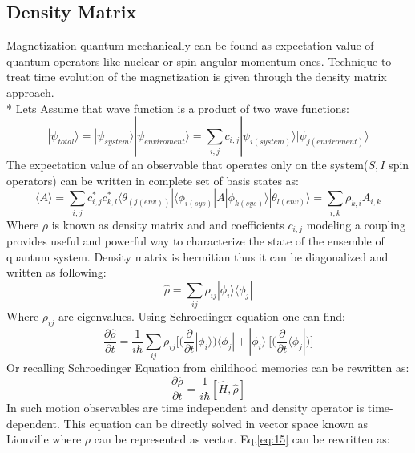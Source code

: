 \subsection{Density Matrix} 
Magnetization quantum mechanically can be found as expectation value of quantum operators like nuclear or spin angular momentum ones. Technique to treat time evolution of the magnetization is given through the density matrix approach.\\* 
Lets Assume that wave function is a product of two wave functions: 
\begin{equation}\label{eq:10}
|\psi_{total}\rangle=|\psi_{system}\rangle|\psi_{enviroment}\rangle=\sum_{i,j} c_{i,j}|\psi_{i(system)}\rangle|\psi_{j(enviroment)}\rangle
\end{equation}
The expectation value of an observable that operates only on the system($S,I$ spin operators) can be written in complete set of basis states as:
\begin{equation}\label{eq:11}
\langle A \rangle=\sum_{i,j} c_{i,j}^*c_{k,l}^*\langle \theta_{(j(env))}|\langle \phi _{i(sys)}|A|\phi_{k(sys)}\rangle|\theta_{l(env)}\rangle=\sum_{i,k}\rho_{k,i}A_{i,k}
\end{equation}
Where $\rho$ is known as density matrix and and coefficients $c_{i,j}$ modeling a coupling  provides useful and powerful way to characterize the state of the ensemble of quantum system. 
Density matrix is hermitian thus it can be diagonalized and written as following: 
\begin{equation}\label{eq:13}
\hat{\rho}=\sum_{ij}\rho_{ij}|\phi_i\rangle\langle \phi_j|
\end{equation} 
Where $\rho_{ij}$ are eigenvalues. 
Using Schroedinger equation one can find: 
\begin{equation}\label{eq:14}
\frac{\partial \hat{\rho}}{\partial t}=\frac{1}{i\hbar}\sum_{ij}\rho_{ij}\Big[\Big(\frac{\partial}{\partial t}|\phi_i\rangle\Big)\langle \phi_j|+|\phi_i\rangle\ \Big[\Big(\frac{\partial}{\partial t}\langle \phi_j|\Big)\Big]
\end{equation} 
Or recalling Schroedinger Equation from childhood memories can be rewritten as: 
 \begin{equation}\label{eq:15}
\frac{\partial \hat{\rho}}{\partial t}=\frac{1}{i\hbar}[\hat{H},\hat{\rho}]
\end{equation} 
In such motion observables are time independent and density operator is time-dependent. 
This equation can be directly solved in vector space known as Liouville where $\rho$ can be represented as vector. Eq.\ref{eq:15} can be rewritten as:

